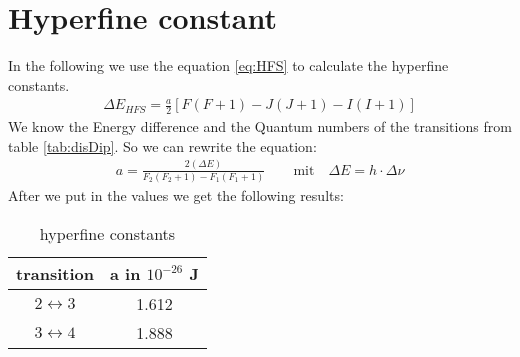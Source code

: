 \section{Hyperfine constant}
In the following we use the equation \ref{eq:HFS} to calculate the hyperfine constants.
\begin{align}
    \label{eq:HFS}
    \Delta E_{HFS} = \frac{a}{2} [F(F+1) - J(J+1) - I(I+1)]
\end{align}
We know the Energy difference and the Quantum numbers of the transitions from table \ref{tab:disDip}. So we can rewrite the equation: 
\begin{align}
    a = \frac{2(\Delta E)}{F_2(F_2+1)-F_1(F_1+1)} \qquad \text{mit} \quad \Delta E = h \cdot \Delta \nu
\end{align}
After we put in the values we get the following results: 
\begin{table}[h]
    \centering
\begin{tabular}{c|c}
    transition & a in $10^{-26}$ J \\
    \hline
    $2\leftrightarrow 3$ & 1.612 \\
    $3\leftrightarrow 4$ & 1.888
\end{tabular}
\caption{hyperfine constants}
\end{table}
